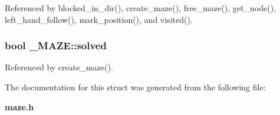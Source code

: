 Referenced by blocked\-\_\-in\-\_\-dir(), create\-\_\-maze(), free\-\_\-maze(), get\-\_\-node(), left\-\_\-hand\-\_\-follow(), mark\-\_\-position(), and visited().

\subsubsection[{solved}]{\setlength{\rightskip}{0pt plus 5cm}bool \-\_\-\-M\-A\-Z\-E\-::solved}\label{struct__MAZE_ab03f6f556019b42aa9b8b76e5b91edfd}


Referenced by create\-\_\-maze().



The documentation for this struct was generated from the following file\-:\begin{DoxyCompactItemize}
\item 
{\bf maze.\-h}\end{DoxyCompactItemize}
